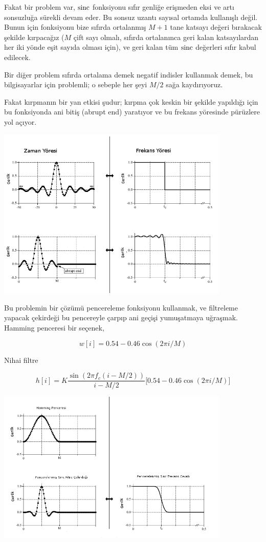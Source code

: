 \documentclass[12pt,fleqn]{article}\usepackage{../../common}
\begin{document}
Fakat bir problem var, $\operatorname{sinc}$ fonksiyonu sıfır genliğe erişmeden eksi ve
artı sonsuzluğa sürekli devam eder. Bu sonsuz uzantı sayısal ortamda
kullanışlı değil. Bunun için fonksiyonu bize sıfırda ortalanmış $M+1$ tane
katsayı değeri bırakacak şekilde kırpacağız ($M$ çift sayı olmalı, sıfırda
ortalanınca geri kalan katsayılardan her iki yönde eşit sayıda olması
için), ve geri kalan tüm $\operatorname{sinc}$ değerleri sıfır kabul edilecek.

Bir diğer problem sıfırda ortalama demek negatif indisler kullanmak demek,
bu bilgisayarlar için problemli; o sebeple her şeyi $M/2$ sağa
kaydırıyoruz. 

Fakat kırpmanın bir yan etkisi şudur; kırpma çok keskin bir şekilde
yapıldığı için bu fonksiyonda ani bitiş (abrupt end) yaratıyor ve bu
frekans yöresinde pürüzlere yol açıyor. 

\includegraphics[width=30em]{compscieng_1_24_15.png}

Bu problemin bir çözümü pencereleme fonksiyonu kullanmak, ve filtreleme
yapacak çekirdeği bu pencereyle çarpıp ani geçişi yumuşatmaya
uğraşmak. Hamming penceresi bir seçenek,

$$ w[i] = 0.54 - 0.46 \cos (2\pi i / M)  $$

Nihai filtre

$$ 
h[i] = K \frac{\sin(2\pi f_c (i-M/2))}{i-M/2} \bigg[
0.54 - 0.46 \cos (2\pi i / M)
\bigg]
$$

\includegraphics[width=30em]{compscieng_1_24_16.png}
\end{document}
